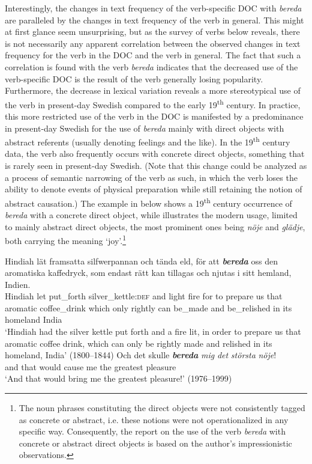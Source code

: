 \documentclass[output=paper]{langscibook}
\begin{document}
Interestingly, the changes in text frequency of the verb-specific DOC with \textit{bereda} are paralleled by the changes in text frequency of the verb in general. This might at first glance seem unsurprising, but as the survey of verbs below reveals, there is not necessarily any apparent correlation between the observed changes in text frequency for the verb in the DOC and the verb in general. The fact that such a correlation is found with the verb \textit{bereda} indicates that the decreased use of the verb-specific DOC is the result of the verb generally losing popularity. Furthermore, the decrease in lexical variation reveals a more stereotypical use of the verb in present-day Swedish compared to the early 19\textsuperscript{th} century. In practice, this more restricted use of the verb in the DOC is manifested by a predominance in present-day Swedish for the use of \textit{bereda} mainly with direct objects with abstract referents (usually denoting feelings and the like). In the 19\textsuperscript{th} century data, the verb also frequently occurs with concrete direct objects, something that is rarely seen in present-day Swedish. (Note that this change could be analyzed as a process of semantic narrowing of the verb as such, in which the verb loses the ability to denote events of physical preparation while still retaining the notion of abstract causation.) The example in  below shows a 19\textsuperscript{th} century occurrence of \textit{bereda} with a concrete direct object, while  illustrates the modern usage, limited to mainly abstract direct objects, the most prominent ones being \textit{nöje} and \textit{glädje}, both carrying the meaning ‘joy’.\footnote{The noun phrases constituting the direct objects were not consistently tagged as concrete or abstract, i.e. these notions were not operationalized in any specific way. Consequently, the report on the use of the verb \textit{bereda} with concrete or abstract direct objects is based on the author’s impressionistic observations.}


\ea \label{ex:valdeson:8}
\gll Hindiah lät framsatta silfwerpannan   och tända eld, för att \textbf{\textit{bereda}} oss  den  aromatiska    kaffedryck,   som  endast  rätt    kan  tillagas och  njutas      i    sitt  hemland,  Indien. \\
   Hindiah let put\_forth  silver\_kettle:\textsc{def}     and light  fire for to prepare us    that  aromatic       coffee\_drink  which  only    rightly  can   be\_made and  be\_relished    in    its    homeland     India\\
\glt ‘Hindiah had the silver kettle put forth and a fire lit, in order to prepare us that aromatic coffee drink, which can only be rightly made and relished in its homeland, India’ (1800–1844)
\ex \label{ex:valdeson:9}
\gll Och  det    skulle \textbf{\textit{bereda}} \textit{mig}  \textit{det}  \textit{största}    \textit{nöje}!\\
  and      that      would  cause      me    the  greatest  pleasure\\
\glt `And that would bring me the greatest pleasure!’ (1976–1999)
\z
\end{document}
